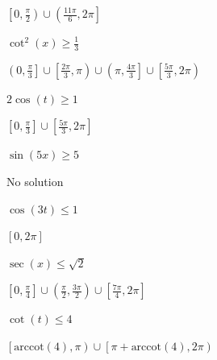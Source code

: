 \documentclass{ximera}
\begin{document}
\begin{question}
\begin{problem}
\begin{solution}
$\left[ 0, \frac{\pi}{2} \right) \cup \left( \frac{11\pi}{6}, 2\pi \right]$
\end{solution}
\end{problem}

\begin{problem}
$\cot^{2} \left( x \right) \geq \frac{1}{3}$

\begin{solution}
$\left( 0, \frac{\pi}{3} \right] \cup \left[ \frac{2\pi}{3}, \pi \right) \cup \left( \pi, \frac{4\pi}{3} \right] \cup \left[ \frac{5\pi}{3}, 2\pi \right)$
\end{solution}
\end{problem}

\begin{problem}
$2\cos(t) \geq 1$ 

\begin{solution}
$\left[0, \frac{\pi}{3}\right] \cup \left[\frac{5\pi}{3}, 2\pi\right]$
\end{solution}
\end{problem}

\begin{problem}
$\sin(5x) \geq 5$ 

\begin{solution}
No solution
\end{solution}
\end{problem}

\begin{problem}
$\cos(3t) \leq 1$

\begin{solution}
$[0, 2\pi]$
\end{solution}
\end{problem}

\begin{problem}
$\sec(x) \leq \sqrt{2}$

\begin{solution}
$\left[0, \frac{\pi}{4} \right] \cup \left(\frac{\pi}{2}, \frac{3\pi}{2}\right) \cup \left[\frac{7\pi}{4}, 2\pi\right]$
\end{solution}
\end{problem}

\begin{problem} \label{firstineqlast}
$\cot(t) \leq 4$ 

\begin{solution}
$\left[\text{arccot}(4), \pi \right) \cup \left[ \pi + \text{arccot}(4), 2\pi\right)$
\end{solution}
\end{problem}

\end{question}
\end{document}
